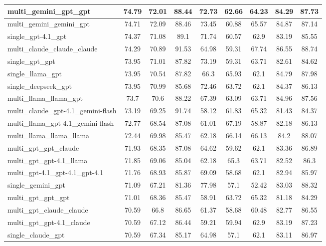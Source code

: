 \documentclass[manuscript, nonacm]{acmart}
\begin{document}
\begin{table}[h!]
\begin{tabular}{|l|c|c|c|c|c|c|c|c|}
\hline
multi\_gemini\_gpt\_gpt & 74.79 & 72.01 & 88.44 & 72.73 & 62.66 & 64.23 & 84.29 & 87.73 \\
\hline
multi\_gemini\_gemini\_gpt & 74.71 & 72.09 & 88.46 & 73.45 & 60.88 & 65.57 & 84.87 & 87.14 \\
\hline
single\_gpt-4.1\_gpt & 74.37 & 71.08 & 89.1 & 71.74 & 60.57 & 62.9 & 83.19 & 85.55 \\
\hline
multi\_claude\_claude\_claude & 74.29 & 70.89 & 91.53 & 64.98 & 59.31 & 67.74 & 86.55 & 88.74 \\
\hline
single\_gpt\_gpt & 73.95 & 71.01 & 87.82 & 73.19 & 59.31 & 63.71 & 82.61 & 84.62 \\
\hline
single\_llama\_gpt & 73.95 & 70.54 & 87.82 & 66.3 & 65.93 & 62.1 & 84.79 & 87.98 \\
\hline
single\_deepseek\_gpt & 73.95 & 70.99 & 85.68 & 72.46 & 63.72 & 62.1 & 84.37 & 86.13 \\
\hline
multi\_llama\_llama\_gpt & 73.7 & 70.6 & 88.22 & 67.39 & 63.09 & 63.71 & 84.96 & 87.56 \\
\hline
multi\_claude\_gpt-4.1\_gemini-flash & 73.19 & 69.25 & 91.74 & 58.12 & 61.83 & 65.32 & 81.43 & 84.37 \\
\hline
multi\_llama\_gpt-4.1\_gemini-flash & 72.77 & 68.54 & 87.08 & 61.01 & 67.19 & 58.87 & 82.18 & 86.13 \\
\hline
multi\_llama\_llama\_llama & 72.44 & 69.98 & 85.47 & 62.18 & 66.14 & 66.13 & 84.2 & 88.07 \\
\hline
multi\_gpt\_gpt\_claude & 71.93 & 68.35 & 87.08 & 64.62 & 59.62 & 62.1 & 83.36 & 86.89 \\
\hline
multi\_gpt\_gpt-4.1\_llama & 71.85 & 69.06 & 85.04 & 62.18 & 65.3 & 63.71 & 82.52 & 86.3 \\
\hline
multi\_gpt-4.1\_gpt-4.1\_gpt-4.1 & 71.76 & 68.93 & 85.87 & 69.09 & 58.68 & 62.1 & 82.94 & 85.97 \\
\hline
single\_gemini\_gpt & 71.09 & 67.21 & 81.36 & 77.98 & 57.1 & 52.42 & 83.03 & 88.32 \\
\hline
multi\_gpt\_gpt\_gpt & 71.01 & 68.36 & 85.47 & 58.91 & 63.72 & 65.32 & 81.18 & 84.29 \\
\hline
multi\_gpt\_claude\_claude & 70.59 & 66.8 & 86.65 & 61.37 & 58.68 & 60.48 & 82.77 & 86.55 \\
\hline
multi\_gpt\_gpt-4.1\_claude & 70.59 & 67.12 & 86.44 & 59.21 & 59.94 & 62.9 & 83.19 & 87.23 \\
\hline
single\_claude\_gpt & 70.59 & 67.34 & 85.17 & 64.98 & 57.1 & 62.1 & 83.11 & 86.97 \\

\end{tabular}
\end{table}
\end{document}
